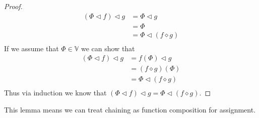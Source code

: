 \documentclass{article}
\begin{document}
\begin{proof}
\begin{align*}
(\Phi \lhd f) \lhd g &= \Phi \lhd g              \tag{Definition of Assignment} \\
                     &= \Phi                     \tag{Definition of Assignment} \\
                     &= \Phi \lhd (f \diamond g) \tag{Definition of Assignment} \\
\end{align*}
If we assume that $\Phi \in \mathbb{V}$ we can show that
\begin{align*}
(\Phi \lhd f) \lhd g &= f(\Phi) \lhd g           \tag{Definition of Assignment} \\
                     &= (f \diamond g) (\Phi)    \tag{Definition of Assignment} \\
                     &= \Phi \lhd (f \diamond g) \tag{Definition of Chain} \\
\end{align*}
Thus via induction we know that $(\Phi\lhd f)\lhd g=\Phi\lhd(f\diamond g)$.
\end{proof}

This lemma means we can treat chaining as function composition for assignment.
\end{document}
